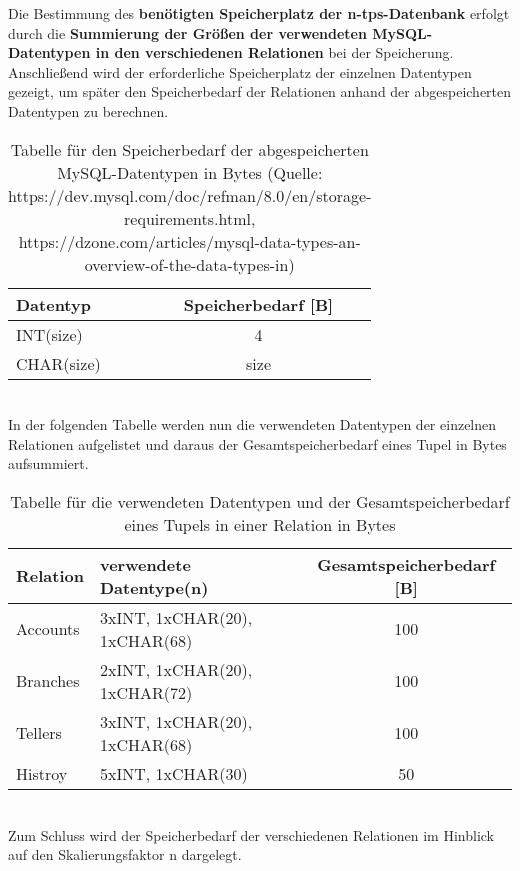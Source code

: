 Die Bestimmung des \textbf{benötigten Speicherplatz der n-tps-Datenbank} erfolgt durch die \textbf{Summierung der Größen der verwendeten MySQL-Datentypen in den verschiedenen Relationen} bei der Speicherung. Anschließend wird der erforderliche Speicherplatz der einzelnen Datentypen gezeigt, um später den Speicherbedarf der Relationen anhand der abgespeicherten Datentypen zu berechnen.
\begin{table}[h!]
    \centering
    \begin{tabular}{|p{3cm}|c|}
        \hline
        Datentyp & Speicherbedarf [B] \\  \hline
        INT(size) & 4 \\ \hline
        CHAR(size) & size \\ \hline
    \end{tabular}
    \caption{Tabelle für den Speicherbedarf der abgespeicherten MySQL-Datentypen in Bytes (Quelle: https://dev.mysql.com/doc/refman/8.0/en/storage-requirements.html, https://dzone.com/articles/mysql-data-types-an-overview-of-the-data-types-in)}
    \label{table:2}
\end{table} \\
In der folgenden Tabelle werden nun die verwendeten Datentypen der einzelnen Relationen aufgelistet und daraus der Gesamtspeicherbedarf eines Tupel in Bytes aufsummiert.
\begin{table}[h!]
    \centering
    \begin{tabular}{|p{1.5cm}|l|c|}
        \hline
        Relation & verwendete Datentype(n) & Gesamtspeicherbedarf [B] \\  \hline
        Accounts & 3xINT, 1xCHAR(20), 1xCHAR(68) & 100 \\ \hline
        Branches & 2xINT, 1xCHAR(20), 1xCHAR(72) & 100 \\ \hline
        Tellers & 3xINT, 1xCHAR(20), 1xCHAR(68) & 100 \\ \hline
        Histroy & 5xINT, 1xCHAR(30) & 50 \\ \hline
    \end{tabular}
    \caption{Tabelle für die verwendeten Datentypen und der Gesamtspeicherbedarf eines Tupels in einer Relation in Bytes}
    \label{table:3}
\end{table} \\
Zum Schluss wird der Speicherbedarf der verschiedenen Relationen im Hinblick auf den Skalierungsfaktor n dargelegt.
